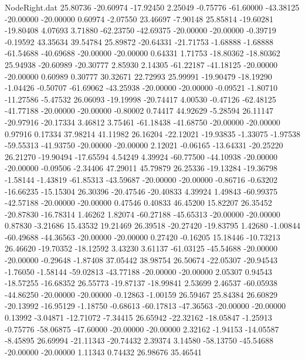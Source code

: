 \begin{filecontents}{NodeRight.dat}
  25.80736  -20.60974  -17.92450     2.25049   -0.75776  -61.60000  -43.38125  -20.00000  -20.00000    0.60974   -2.07550   23.46697   -7.90148
  25.85814  -19.60281  -19.80408     4.07693    3.71880  -62.23750  -42.69375  -20.00000  -20.00000   -0.39719   -0.19592   43.35634   39.54784
  25.89872  -20.64331  -21.71753    -1.68888   -1.68888  -61.54688  -40.69688  -20.00000  -20.00000    0.64331    1.71753  -18.80362  -18.80362
  25.94938  -20.60989  -20.30777     2.85930    2.14305  -61.22187  -41.18125  -20.00000  -20.00000    0.60989    0.30777   30.32671   22.72993
  25.99991  -19.90479  -18.19290    -1.04426   -0.50707  -61.69062  -43.25938  -20.00000  -20.00000   -0.09521   -1.80710  -11.27586   -5.47532
  26.06093  -19.19998  -20.74417     4.00530   -0.47126  -62.48125  -41.77188  -20.00000  -20.00000   -0.80002    0.74417   44.92629   -5.28594
  26.11147  -20.97916  -20.17334     3.46812    3.75461  -61.18438  -41.68750  -20.00000  -20.00000    0.97916    0.17334   37.98214   41.11982
  26.16204  -22.12021  -19.93835    -1.33075   -1.97538  -59.55313  -41.93750  -20.00000  -20.00000    2.12021   -0.06165  -13.64331  -20.25220
  26.21270  -19.90494  -17.65594     4.54249    4.39924  -60.77500  -44.10938  -20.00000  -20.00000   -0.09506   -2.34406   47.29011   45.79879
  26.25336  -19.13284  -19.36798    -1.58144   -1.43819  -61.85313  -43.59687  -20.00000  -20.00000   -0.86716   -0.63202  -16.66235  -15.15304
  26.30396  -20.47546  -20.40833     4.39924    1.49843  -60.99375  -42.57188  -20.00000  -20.00000    0.47546    0.40833   46.45200   15.82207
  26.35452  -20.87830  -16.78314     1.46262    1.82074  -60.27188  -45.65313  -20.00000  -20.00000    0.87830   -3.21686   15.43532   19.21469
  26.39518  -20.27420  -19.83795     1.42680   -1.00844  -60.49688  -44.36563  -20.00000  -20.00000    0.27420   -0.16205   15.18446  -10.73213
  26.46620  -19.70352  -18.12592     3.43230    3.61137  -61.03125  -45.54688  -20.00000  -20.00000   -0.29648   -1.87408   37.05442   38.98754
  26.50674  -22.05307  -20.94543    -1.76050   -1.58144  -59.02813  -43.77188  -20.00000  -20.00000    2.05307    0.94543  -18.57255  -16.68352
  26.55773  -19.87137  -18.99841     2.53699    2.46537  -60.05938  -44.86250  -20.00000  -20.00000   -0.12863   -1.00159   26.59467   25.84384
  26.60829  -20.13992  -16.95129    -1.18750   -0.68613  -60.17813  -47.36563  -20.00000  -20.00000    0.13992   -3.04871  -12.71072   -7.34415
  26.65942  -22.32162  -18.05847    -1.25913   -0.75776  -58.06875  -47.60000  -20.00000  -20.00000    2.32162   -1.94153  -14.05587   -8.45895
  26.69994  -21.11343  -20.74432     2.39374    3.14580  -58.13750  -45.54688  -20.00000  -20.00000    1.11343    0.74432   26.98676   35.46541

\end{filecontents}
